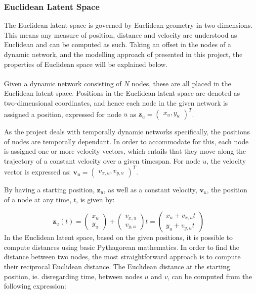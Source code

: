 \subsubsection{Euclidean Latent Space}
\label{sec:Method:LSM:EuclideanLatentSpace}
The Euclidean latent space is governed by Euclidean geometry in two dimensions.
This means any measure of position, distance and velocity are understood as Euclidean and can be computed as such. 
Taking an offset in the nodes of a dynamic network, and the modelling approach of presented in this project, the properties of Euclidean space will be explained below.
\\\\
Given a dynamic network consisting of $N$ nodes, these are all placed in the Euclidean latent space. 
Positions in the Euclidean latent space are denoted as two-dimensional coordinates, and hence each node in the given network is assigned a position, expressed for node $u$ as
$\textbf{z}_u = \begin{pmatrix}
x_u, y_u
\end{pmatrix}^T$.

As the project deals with temporally dynamic networks specifically, the positions of nodes are temporally dependant. 
In order to accommodate for this, each node is assigned one or more velocity vectors, which entails that they move along the trajectory of a constant velocity over a given timespan.
For node $u$, the velocity vector is expressed as:
$\textbf{v}_u = \begin{pmatrix}
v_{x,u}, v_{y,u}
\end{pmatrix}^T$.

By having a starting position, $\textbf{z}_u$, as well as a constant velocity, $\textbf{v}_u$, the position of a node at any time, $t$, is given by: 

\begin{equation}
    \textbf{z}_u(t) = \begin{pmatrix}
    x_u\\
    y_u
    \end{pmatrix}
    +
    \begin{pmatrix}
    v_{x,u}\\
    v_{y,u}
    \end{pmatrix}
    t
    = 
    \begin{pmatrix}
    x_u + v_{x,u}t\\
    y_u + v_{y,u}t
    \label{eq:latent_pos}
    \end{pmatrix}
\end{equation}
In the Euclidean latent space, based on the given positions, it is possible to compute distances using basic Pythagorean mathematics. 
In order to find the distance between two nodes, the most straightforward approach is to compute their reciprocal Euclidean distance.
The Euclidean distance at the starting position, ie. disregarding time, between nodes $u$ and $v$, can be computed from the following expression:

